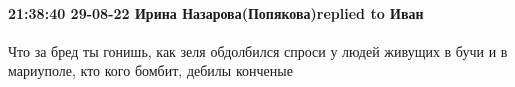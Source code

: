  
 
 
 
 

\paragraph{21:38:40 29-08-22 Ирина Назарова(Попякова)replied to Иван}

Что за бред ты гонишь, как зеля обдолбился спроси у людей живущих в бучи и в
мариуполе, кто кого бомбит, дебилы конченые
